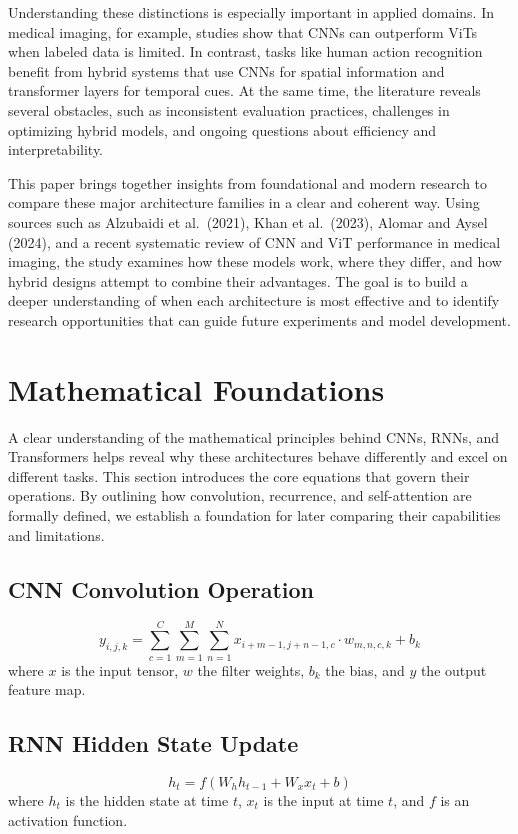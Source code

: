 \documentclass[12pt]{article}
\begin{document}
Understanding these distinctions is especially important in applied domains. In medical imaging, for example, studies show that CNNs can outperform ViTs when labeled data is limited. In contrast, tasks like human action recognition benefit from hybrid systems that use CNNs for spatial information and transformer layers for temporal cues. At the same time, the literature reveals several obstacles, such as inconsistent evaluation practices, challenges in optimizing hybrid models, and ongoing questions about efficiency and interpretability.

This paper brings together insights from foundational and modern research to compare these major architecture families in a clear and coherent way. Using sources such as Alzubaidi et al.\ (2021), Khan et al.\ (2023), Alomar and Aysel (2024), and a recent systematic review of CNN and ViT performance in medical imaging, the study examines how these models work, where they differ, and how hybrid designs attempt to combine their advantages. The goal is to build a deeper understanding of when each architecture is most effective and to identify research opportunities that can guide future experiments and model development.

\newpage
\section{Mathematical Foundations}
A clear understanding of the mathematical principles behind CNNs, RNNs, and
Transformers helps reveal why these architectures behave differently and excel
on different tasks. This section introduces the core equations that govern
their operations. By outlining how convolution, recurrence, and self-attention
are formally defined, we establish a foundation for later comparing their
capabilities and limitations.
\subsection{CNN Convolution Operation}
\[
y_{i,j,k} = \sum_{c=1}^{C} \sum_{m=1}^{M} \sum_{n=1}^{N} x_{i+m-1,j+n-1,c} \cdot w_{m,n,c,k} + b_k
\]
where \(x\) is the input tensor, \(w\) the filter weights, \(b_k\) the bias, and \(y\) the output feature map.

\subsection{RNN Hidden State Update}
\[
h_t = f(W_h h_{t-1} + W_x x_t + b)
\]
where \(h_t\) is the hidden state at time \(t\), \(x_t\) is the input at time \(t\), and \(f\) is an activation function.
\end{document}
